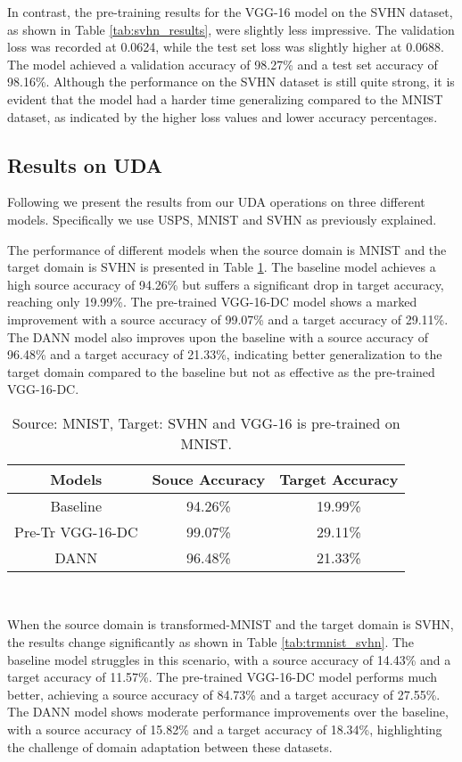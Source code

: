 \documentclass[conference]{IEEEtran}
\begin{document}
In contrast, the pre-training results for the VGG-16 model on the SVHN dataset, as shown in Table \ref{tab:svhn_results}, were slightly less impressive. The validation loss was recorded at 0.0624, while the test set loss was slightly higher at 0.0688. The model achieved a validation accuracy of 98.27\% and a test set accuracy of 98.16\%. Although the performance on the SVHN dataset is still quite strong, it is evident that the model had a harder time generalizing compared to the MNIST dataset, as indicated by the higher loss values and lower accuracy percentages.

\subsection{Results on UDA}
Following we present the results from our UDA operations on three different models. Specifically we use USPS, MNIST and SVHN as previously explained.


The performance of different models when the source domain is MNIST and the target domain is SVHN is presented in Table \ref{tab:mnist_svhn}. The baseline model achieves a high source accuracy of 94.26\% but suffers a significant drop in target accuracy, reaching only 19.99\%. The pre-trained VGG-16-DC model shows a marked improvement with a source accuracy of 99.07\% and a target accuracy of 29.11\%. The DANN model also improves upon the baseline with a source accuracy of 96.48\% and a target accuracy of 21.33\%, indicating better generalization to the target domain compared to the baseline but not as effective as the pre-trained VGG-16-DC.


\begin{table}[h!]
  \centering
  \begin{tabular}{||c c c||}
  \hline
    Models & Souce Accuracy & Target Accuracy \\ 
    \hline \hline
    Baseline & 94.26\% & 19.99\% \\  
    Pre-Tr VGG-16-DC & 99.07\% & 29.11\% \\
    DANN & 96.48\% & 21.33\% \\
    \hline
  \end{tabular} \\ [1ex]
  \caption{Source: MNIST, Target: SVHN and VGG-16 is pre-trained on MNIST.}
  \label{tab:mnist_svhn}
\end{table}

When the source domain is transformed-MNIST and the target domain is SVHN, the results change significantly as shown in Table \ref{tab:trmnist_svhn}. The baseline model struggles in this scenario, with a source accuracy of 14.43\% and a target accuracy of 11.57\%. The pre-trained VGG-16-DC model performs much better, achieving a source accuracy of 84.73\% and a target accuracy of 27.55\%. The DANN model shows moderate performance improvements over the baseline, with a source accuracy of 15.82\% and a target accuracy of 18.34\%, highlighting the challenge of domain adaptation between these datasets.
\end{document}

